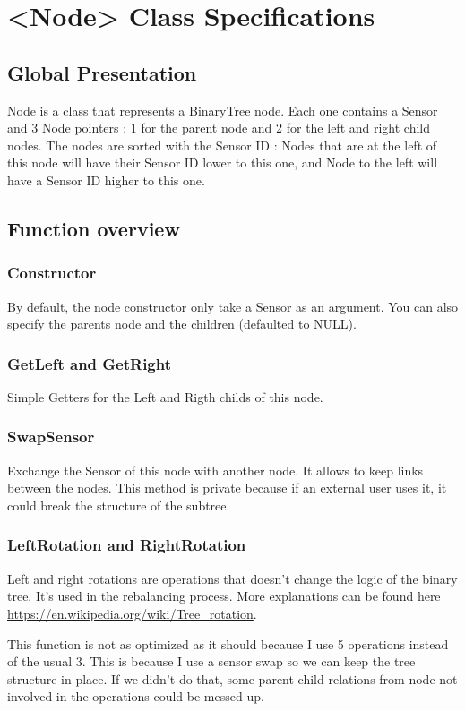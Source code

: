 \documentclass[10pt]{article}
\begin{document}
\section{<Node> Class Specifications}
\subsection{Global Presentation}


Node is a class that represents a BinaryTree node. Each one contains a Sensor and 3 Node pointers : 1 for the parent node and 2 for the left and right child nodes. The nodes are sorted with the Sensor ID : Nodes that are at the left of this node will have their Sensor ID lower to this one, and Node to the left will have a Sensor ID higher to this one.
\subsection{Function overview}
\subsubsection*{Constructor}
By default, the node constructor only take a Sensor as an argument. You can also specify the parents node and the children (defaulted to NULL).
\subsubsection*{GetLeft and GetRight}
Simple Getters for the Left and Rigth childs of this node.
\subsubsection*{SwapSensor}
Exchange the Sensor of this node with another node. It allows to keep links between the nodes. This method is private because if an external user uses it, it could break the structure of the subtree.

\subsubsection*{LeftRotation and RightRotation}
Left and right rotations are operations that doesn't change the logic of the binary tree. It's used in the rebalancing process. More explanations can be found here \url{https://en.wikipedia.org/wiki/Tree_rotation}.

This function is not as optimized as it should because I use 5 operations instead of the usual 3. This is because I use a sensor swap so we can keep the tree structure in place. If we didn't do that, some parent-child relations from node not involved in the operations could be messed up.
\end{document}
